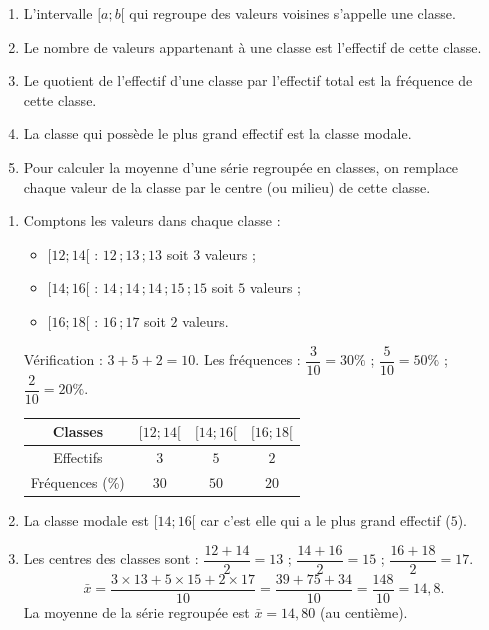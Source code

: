 \documentclass[11pt]{article}
\newcommand{\cle}[1]{{\popxbold\color{popdark}#1}}
\begin{document}
\begin{corrige}
\begin{enumerate}
    \item L'intervalle $[a ; b[$ qui regroupe des valeurs voisines s'appelle une \cle{classe}.
    \item Le nombre de valeurs appartenant à une classe est l'\cle{effectif} de cette classe.
    \item Le quotient de l'effectif d'une classe par l'effectif total est la \cle{fréquence} de cette classe.
    \item La classe qui possède le plus grand effectif est la \cle{classe modale}.
    \item Pour calculer la moyenne d'une série regroupée en classes, on remplace chaque valeur de la classe par le \cle{centre} (ou milieu) de cette classe.
\end{enumerate}
\end{corrige}

\begin{corrige}
\begin{enumerate}
    \item Comptons les valeurs dans chaque classe :
    \begin{itemize}
        \item $[12 ; 14[$ : $12\,; 13\,; 13$ soit $3$ valeurs ;
        \item $[14 ; 16[$ : $14\,; 14\,; 14\,; 15\,; 15$ soit $5$ valeurs ;
        \item $[16 ; 18[$ : $16\,; 17$ soit $2$ valeurs.
    \end{itemize}
    Vérification : $3 + 5 + 2 = 10$. Les fréquences : $\dfrac{3}{10} = 30\%$ ; $\dfrac{5}{10} = 50\%$ ; $\dfrac{2}{10} = 20\%$.
    \begin{center}
    \begin{tabular}{|c|c|c|c|}\hline
    Classes & $[12 ; 14[$ & $[14 ; 16[$ & $[16 ; 18[$ \\ \hline
    Effectifs & $3$ & $5$ & $2$ \\ \hline
    Fréquences (\%) & $30$ & $50$ & $20$ \\ \hline
    \end{tabular}
    \end{center}
    \item La classe modale est $[14 ; 16[$ car c'est elle qui a le plus grand effectif ($5$).
    \item Les centres des classes sont : $\dfrac{12+14}{2} = 13$ ; $\dfrac{14+16}{2} = 15$ ; $\dfrac{16+18}{2} = 17$.
    \[ \bar{x} = \dfrac{3 \times 13 + 5 \times 15 + 2 \times 17}{10} = \dfrac{39 + 75 + 34}{10} = \dfrac{148}{10} = 14,8. \]
    La moyenne de la série regroupée est $\bar{x} = 14,80$ (au centième).
\end{enumerate}
\end{corrige}
\end{document}
